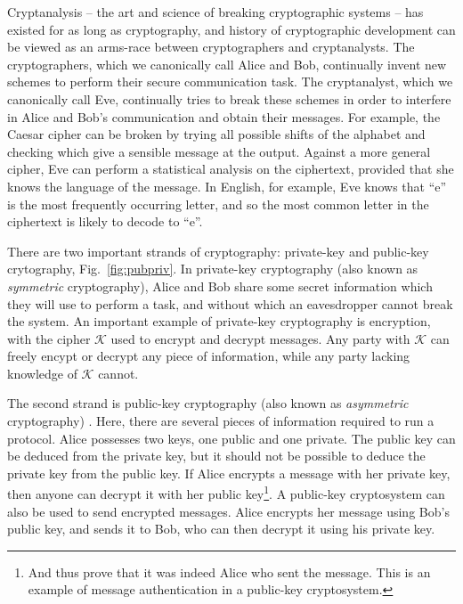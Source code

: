 Cryptanalysis -- the art and science of breaking cryptographic systems -- has existed for as long as cryptography, and history of cryptographic development can be viewed as an arms-race between cryptographers and cryptanalysts. The cryptographers, which we canonically call Alice and Bob, continually invent new schemes to perform their secure communication task. The cryptanalyst, which we canonically call Eve, continually tries to break these schemes in order to interfere in Alice and Bob's communication and obtain their messages. For example, the Caesar cipher can be broken by trying all possible shifts of the alphabet and checking which give a sensible message at the output. Against a more general cipher, Eve can perform a statistical analysis on the ciphertext, provided that she knows the language of the message. In English, for example, Eve knows that ``e'' is the most frequently occurring letter, and so the most common letter in the ciphertext is likely to decode to ``e''.

There are two important strands of cryptography: private-key and public-key crytography, Fig.~\ref{fig:pubpriv}. In private-key cryptography (also known as \emph{symmetric} cryptography), Alice and Bob share some secret information which they will use to perform a task, and without which an eavesdropper cannot break the system. An important example of private-key cryptography is encryption, with the cipher $\mathcal{K}$ used to encrypt and decrypt messages. Any party with $\mathcal{K}$ can freely encypt or decrypt any piece of information, while any party lacking knowledge of $\mathcal{K}$ cannot. %



The second strand is public-key cryptography (also known as \emph{asymmetric} cryptography) \cite{Diffie1976}. Here, there are several pieces of information required to run a protocol. %
Alice possesses two keys, one public and one private. The public key can be deduced from the private key, but it should not be possible to deduce the private key from the public key. If Alice encrypts a message with her private key, then anyone can decrypt it with her public key\footnote{And thus prove that it was indeed Alice who sent the message. This is an example of message authentication in a public-key cryptosystem.}. A public-key cryptosystem can also be used to send encrypted messages. Alice encrypts her message using Bob's public key, and sends it to Bob, who can then decrypt it using his private key.

